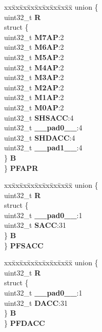\begin{DoxyCompactItemize}
\begin{tabbing}
\end{tabbing}\item 
\mbox{\label{structFLASH__tag_adfb6d9035d6ff41da576965013a2f5e9}} 
\begin{tabbing}
xx\=xx\=xx\=xx\=xx\=xx\=xx\=xx\=xx\=\kill
union \{\\
\>uint32\_t {\bfseries R}\\
\>struct \{\\
\>\>uint32\_t {\bfseries M7AP}:2\\
\>\>uint32\_t {\bfseries M6AP}:2\\
\>\>uint32\_t {\bfseries M5AP}:2\\
\>\>uint32\_t {\bfseries M4AP}:2\\
\>\>uint32\_t {\bfseries M3AP}:2\\
\>\>uint32\_t {\bfseries M2AP}:2\\
\>\>uint32\_t {\bfseries M1AP}:2\\
\>\>uint32\_t {\bfseries M0AP}:2\\
\>\>uint32\_t {\bfseries SHSACC}:4\\
\>\>uint32\_t {\bfseries \_\_pad0\_\_}:4\\
\>\>uint32\_t {\bfseries SHDACC}:4\\
\>\>uint32\_t {\bfseries \_\_pad1\_\_}:4\\
\>\} {\bfseries B}\\
\} {\bfseries PFAPR}\\

\end{tabbing}\item 
\mbox{\label{structFLASH__tag_a92cc91bc23d57b2cfe3d266de4d313a0}} 
\begin{tabbing}
xx\=xx\=xx\=xx\=xx\=xx\=xx\=xx\=xx\=\kill
union \{\\
\>uint32\_t {\bfseries R}\\
\>struct \{\\
\>\>uint32\_t {\bfseries \_\_pad0\_\_}:1\\
\>\>uint32\_t {\bfseries SACC}:31\\
\>\} {\bfseries B}\\
\} {\bfseries PFSACC}\\

\end{tabbing}\item 
\mbox{\label{structFLASH__tag_a006314b84578ec649258a87d34e75d2e}} 
\begin{tabbing}
xx\=xx\=xx\=xx\=xx\=xx\=xx\=xx\=xx\=\kill
union \{\\
\>uint32\_t {\bfseries R}\\
\>struct \{\\
\>\>uint32\_t {\bfseries \_\_pad0\_\_}:1\\
\>\>uint32\_t {\bfseries DACC}:31\\
\>\} {\bfseries B}\\
\} {\bfseries PFDACC}\\


\end{tabbing}
\end{DoxyCompactItemize}
